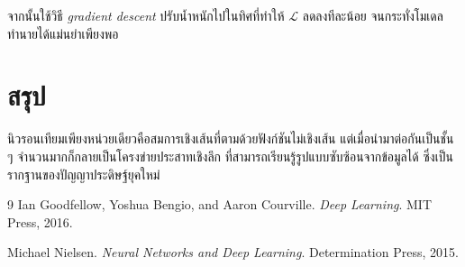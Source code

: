 \documentclass[12pt]{article}
\begin{document}
จากนั้นใช้วิธี \textit{gradient descent} ปรับน้ำหนักไปในทิศที่ทำให้
$\mathcal{L}$ ลดลงทีละน้อย จนกระทั่งโมเดลทำนายได้แม่นยำเพียงพอ

\section{สรุป}
นิวรอนเทียมเพียงหน่วยเดียวคือสมการเชิงเส้นที่ตามด้วยฟังก์ชันไม่เชิงเส้น
แต่เมื่อนำมาต่อกันเป็นชั้น ๆ จำนวนมากก็กลายเป็นโครงข่ายประสาทเชิงลึก
ที่สามารถเรียนรู้รูปแบบซับซ้อนจากข้อมูลได้ ซึ่งเป็นรากฐานของปัญญาประดิษฐ์ยุคใหม่

\begin{thebibliography}{9}
Ian Goodfellow, Yoshua Bengio, and Aaron Courville.
\textit{Deep Learning}. MIT Press, 2016.

Michael Nielsen.
\textit{Neural Networks and Deep Learning}.
Determination Press, 2015.
\end{thebibliography}
\end{document}
